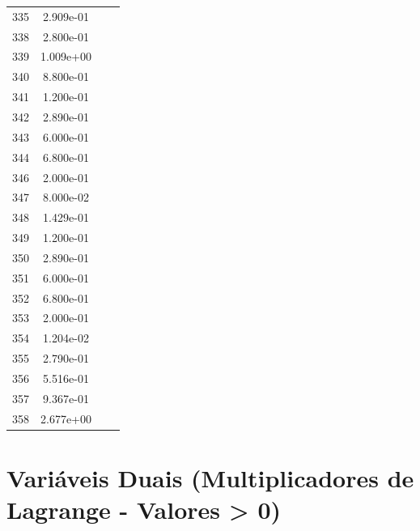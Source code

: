 \documentclass[12pt]{article}
\begin{document}
\begin{longtable}{@{}cccc@{}}
335 & 2.909e-01 &  &  \\
338 & 2.800e-01 &  &  \\
339 & 1.009e+00 &  &  \\
340 & 8.800e-01 &  &  \\
341 & 1.200e-01 &  &  \\
342 & 2.890e-01 &  &  \\
343 & 6.000e-01 &  &  \\
344 & 6.800e-01 &  &  \\
346 & 2.000e-01 &  &  \\
347 & 8.000e-02 &  &  \\
348 & 1.429e-01 &  &  \\
349 & 1.200e-01 &  &  \\
350 & 2.890e-01 &  &  \\
351 & 6.000e-01 &  &  \\
352 & 6.800e-01 &  &  \\
353 & 2.000e-01 &  &  \\
354 & 1.204e-02 &  &  \\
355 & 2.790e-01 &  &  \\
356 & 5.516e-01 &  &  \\
357 & 9.367e-01 &  &  \\
358 & 2.677e+00 &  &  \\

\bottomrule
\end{longtable}


\section{Variáveis Duais (Multiplicadores de Lagrange - Valores > 0)}
\end{document}
